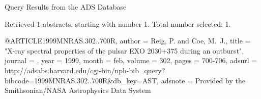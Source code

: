 Query Results from the ADS Database


Retrieved 1 abstracts, starting with number 1.  Total number selected: 1.

@ARTICLE{1999MNRAS.302..700R,
   author = {{Reig}, P. and {Coe}, M.~J.},
    title = "{X-ray spectral properties of the pulsar EXO 2030+375 during an outburst}",
  journal = {\mnras},
     year = 1999,
    month = feb,
   volume = 302,
    pages = {700-706},
   adsurl = {http://adsabs.harvard.edu/cgi-bin/nph-bib_query?bibcode=1999MNRAS.302..700R&db_key=AST},
  adsnote = {Provided by the Smithsonian/NASA Astrophysics Data System}
}


